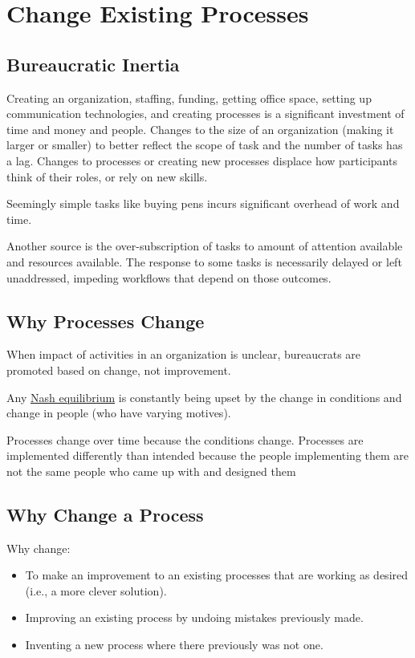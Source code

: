 \section{Change Existing Processes\label{sec:change-a-process}}

\subsection*{Bureaucratic Inertia}

Creating an organization, staffing, funding, getting office space, setting up communication technologies, and creating processes is a significant investment of time and money and people. Changes to the size of an organization (making it larger or smaller) to better reflect the scope of task and the number of tasks has a lag. Changes to processes or creating new processes displace how participants think of their roles, or rely on new skills. 

Seemingly simple tasks like buying pens incurs significant overhead of work and time. 

Another source is the over-subscription of tasks to amount of attention available and resources available. The response to some tasks is necessarily delayed or left unaddressed, impeding workflows that depend on those outcomes. 



\subsection*{Why Processes Change}


When impact of activities in an organization is unclear, bureaucrats are promoted based on change, not improvement.

Any \href{https://en.wikipedia.org/wiki/Nash_equilibrium}{Nash equilibrium} is constantly being upset by the change in conditions and change in people (who have varying motives).

Processes change over time because the conditions change. Processes are implemented differently than intended because the people implementing them are not the same people who came up with and designed them


\subsection*{Why Change a Process}
Why change:
\begin{itemize}
    \item To make an improvement to an existing processes that are working as desired (i.e., a more clever solution).
    \item Improving an existing process by undoing mistakes previously made.
    \item Inventing a new process where there previously was not one.
\end{itemize}

